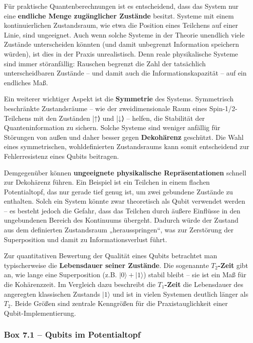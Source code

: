 Für praktische Quantenberechnungen ist es entscheidend, dass das System nur eine \textbf{endliche Menge zugänglicher Zustände} besitzt. Systeme mit einem kontinuierlichen Zustandsraum, wie etwa die Position eines Teilchens auf einer Linie, sind ungeeignet. Auch wenn solche Systeme in der Theorie unendlich viele Zustände unterscheiden könnten (und damit unbegrenzt Information speichern würden), ist dies in der Praxis unrealistisch. Denn reale physikalische Systeme sind immer störanfällig: Rauschen begrenzt die Zahl der tatsächlich unterscheidbaren Zustände – und damit auch die Informationskapazität – auf ein endliches Maß.

Ein weiterer wichtiger Aspekt ist die \textbf{Symmetrie} des Systems. Symmetrisch beschränkte Zustandsräume – wie der zweidimensionale Raum eines Spin-1/2-Teilchens mit den Zuständen |↑⟩ und |↓⟩ – helfen, die Stabilität der Quanteninformation zu sichern. Solche Systeme sind weniger anfällig für Störungen von außen und daher besser gegen \textbf{Dekohärenz} geschützt. Die Wahl eines symmetrischen, wohldefinierten Zustandsraums kann somit entscheidend zur Fehlerresistenz eines Qubits beitragen.

Demgegenüber können \textbf{ungeeignete physikalische Repräsentationen} schnell zur Dekohärenz führen. Ein Beispiel ist ein Teilchen in einem flachen Potentialtopf, das nur gerade tief genug ist, um zwei gebundene Zustände zu enthalten. Solch ein System könnte zwar theoretisch als Qubit verwendet werden – es besteht jedoch die Gefahr, dass das Teilchen durch äußere Einflüsse in den ungebundenen Bereich des Kontinuums übergeht. Dadurch würde der Zustand aus dem definierten Zustandsraum „herausspringen“, was zur Zerstörung der Superposition und damit zu Informationsverlust führt.

Zur quantitativen Bewertung der Qualität eines Qubits betrachtet man typischerweise die \textbf{Lebensdauer seiner Zustände}. Die sogenannte \textbf{$T_2$-Zeit} gibt an, wie lange eine Superposition (z.B. 
$|0\rangle+|1\rangle$) 
stabil bleibt – sie ist ein Maß für die Kohärenzzeit. Im Vergleich dazu beschreibt die \textbf{$T_1$-Zeit} die Lebensdauer des angeregten klassischen Zustands $|1\rangle$ 
und ist in vielen Systemen deutlich länger als $T_2$. Beide Größen sind zentrale Kenngrößen für die Praxistauglichkeit einer Qubit-Implementierung.


\subsubsection{ \textbf{Box 7.1 – Qubits im Potentialtopf}}

